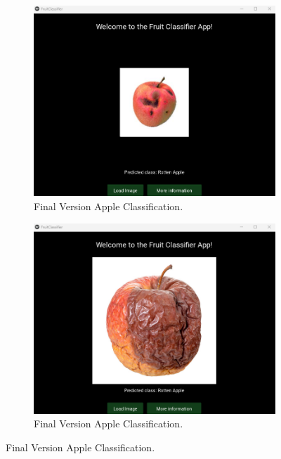\documentclass[conference]{IEEEtran}
\begin{document}
\begin{figure}[h]
    \centering
    \begin{subfigure}[b]{0.48\linewidth}
        \centering
        \includegraphics[width=\linewidth]{Mlayer appelR1.png}
        \caption{Final Version Apple Classification.}
        \label{figFA}
    \end{subfigure}
    \hfill
    \begin{subfigure}[b]{0.48\linewidth}
        \centering
        \includegraphics[width=\linewidth]{Mlayer appelR2.png}
        \caption{Final Version Apple Classification.}
        \label{figFB}
    \end{subfigure}

\end{figure}
\end{document}
